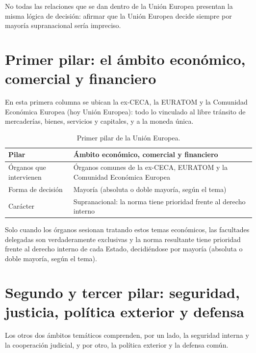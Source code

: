 \documentclass[12pt,oneside]{book}
\begin{document}
\begin{importante}
No todas las relaciones que se dan dentro de la Unión Europea presentan la misma lógica de decisión: afirmar que la Unión Europea decide siempre por mayoría supranacional sería impreciso.
\end{importante}

\section{Primer pilar: el ámbito económico, comercial y financiero}

En esta primera columna se ubican la ex-CECA, la EURATOM y la Comunidad Económica Europea (hoy Unión Europea): todo lo vinculado al libre tránsito de mercaderías, bienes, servicios y capitales, y a la moneda única.

\begin{table}[H]
\centering
\renewcommand{\arraystretch}{1.3}
\begin{tabularx}{\textwidth}{>{\raggedright\arraybackslash}p{}>{\raggedright\arraybackslash}X}
\toprule
\textbf{Pilar} & \textbf{Ámbito económico, comercial y financiero} \\
\midrule
Órganos que intervienen & Órganos comunes de la ex-CECA, EURATOM y la Comunidad Económica Europea \\
Forma de decisión & Mayoría (absoluta o doble mayoría, según el tema) \\
Carácter & Supranacional: la norma tiene prioridad frente al derecho interno \\
\bottomrule
\end{tabularx}
\caption{Primer pilar de la Unión Europea.}
\end{table}

Solo cuando los órganos sesionan tratando estos temas económicos, las facultades delegadas son verdaderamente exclusivas y la norma resultante tiene prioridad frente al derecho interno de cada Estado, decidiéndose por mayoría (absoluta o doble mayoría, según el tema).

\section{Segundo y tercer pilar: seguridad, justicia, política exterior y defensa}

Los otros dos ámbitos temáticos comprenden, por un lado, la seguridad interna y la cooperación judicial, y por otro, la política exterior y la defensa común.
\end{document}
